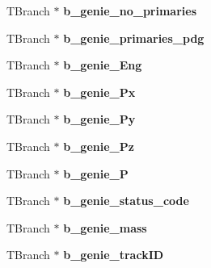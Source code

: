\begin{DoxyCompactItemize}
\item 
\hypertarget{classanatree_a743aeb64ffacd746a1092ab0c977fb7b}{T\-Branch $\ast$ {\bfseries b\-\_\-genie\-\_\-no\-\_\-primaries}}\label{classanatree_a743aeb64ffacd746a1092ab0c977fb7b}

\item 
\hypertarget{classanatree_ae244d4ab7cf75479fa6b0d55361e730e}{T\-Branch $\ast$ {\bfseries b\-\_\-genie\-\_\-primaries\-\_\-pdg}}\label{classanatree_ae244d4ab7cf75479fa6b0d55361e730e}

\item 
\hypertarget{classanatree_a16458ca4cb41a63c31daa341db5da251}{T\-Branch $\ast$ {\bfseries b\-\_\-genie\-\_\-\-Eng}}\label{classanatree_a16458ca4cb41a63c31daa341db5da251}

\item 
\hypertarget{classanatree_a4461eb0668e09bac7267bafc18dce9b3}{T\-Branch $\ast$ {\bfseries b\-\_\-genie\-\_\-\-Px}}\label{classanatree_a4461eb0668e09bac7267bafc18dce9b3}

\item 
\hypertarget{classanatree_a7a98969216617c910e72975a1ff31d03}{T\-Branch $\ast$ {\bfseries b\-\_\-genie\-\_\-\-Py}}\label{classanatree_a7a98969216617c910e72975a1ff31d03}

\item 
\hypertarget{classanatree_a6e5e3fa784472042f877267c2ab1593e}{T\-Branch $\ast$ {\bfseries b\-\_\-genie\-\_\-\-Pz}}\label{classanatree_a6e5e3fa784472042f877267c2ab1593e}

\item 
\hypertarget{classanatree_a69b72987e24babf9f1fe5fc812c533af}{T\-Branch $\ast$ {\bfseries b\-\_\-genie\-\_\-\-P}}\label{classanatree_a69b72987e24babf9f1fe5fc812c533af}

\item 
\hypertarget{classanatree_a03fa50d25c4b11f5c0903ab816008bd5}{T\-Branch $\ast$ {\bfseries b\-\_\-genie\-\_\-status\-\_\-code}}\label{classanatree_a03fa50d25c4b11f5c0903ab816008bd5}

\item 
\hypertarget{classanatree_acd3c9015618983ea55cd390cf8931ded}{T\-Branch $\ast$ {\bfseries b\-\_\-genie\-\_\-mass}}\label{classanatree_acd3c9015618983ea55cd390cf8931ded}

\item 
\hypertarget{classanatree_a76511019966b4c85d648021a9f472620}{T\-Branch $\ast$ {\bfseries b\-\_\-genie\-\_\-track\-I\-D}}\label{classanatree_a76511019966b4c85d648021a9f472620}


\end{DoxyCompactItemize}
